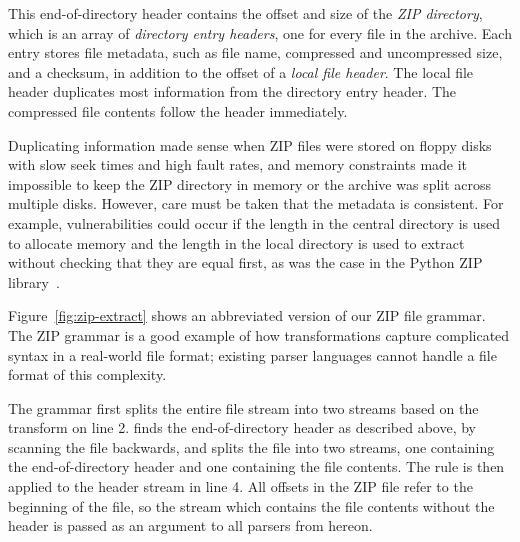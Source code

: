  This end-of-directory
header contains the offset and size of the \emph{ZIP directory}, which
is an array of \emph{directory entry headers}, one for every file
in the archive.  Each entry stores file metadata, such as file name,
compressed and uncompressed size, and a checksum, in addition to the
offset of a \emph{local file header}. The local file header duplicates
most information from the directory entry header. The compressed file
contents follow the header immediately.



Duplicating information made sense when ZIP files were stored on floppy
disks with slow seek times and high fault rates, and memory constraints
made it impossible to keep the ZIP directory in memory or the archive
was split across multiple disks.  However, care must be taken that the
metadata is consistent. For example, vulnerabilities could occur if
the length in the central directory is used to allocate memory and the
length in the local directory is used to extract without checking that
they are equal first, as was the case in the Python ZIP
library~\cite{python-bug:20078}.
\begin{comment}
\begin{figure}[tb]
\smaller[0.5]

\caption{Signatures of stream transform functions for handling the
end-to-beginning structure of ZIP files.}
\label{fig:zip-eod-xform}
\end{figure}
\end{comment}
Figure~\ref{fig:zip-extract} shows an abbreviated version of our ZIP
file grammar.  The ZIP grammar is a good example of how transformations
capture complicated syntax in a real-world file format; existing parser
languages cannot handle a file format of this complexity.

The  grammar first splits the entire file stream into two
streams based on the  transform on line 2.
finds the end-of-directory header as described above, by scanning the
file backwards, and splits the file into two streams, one containing
the end-of-directory header and one containing the file contents. The
 rule is then applied to the header stream in
line 4. All offsets in the ZIP file refer to the beginning of the
file, so the stream  which contains the file contents
without the header is passed as an argument to all parsers from
hereon. 

